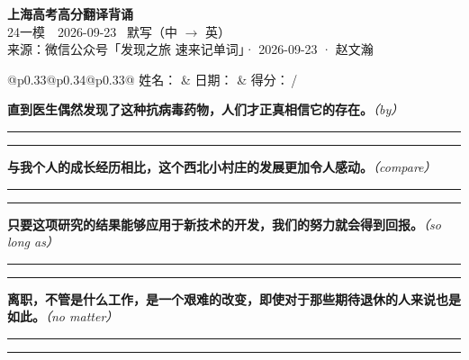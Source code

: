 \documentclass[11pt,a4paper]{article}
\newcommand{\num}[1]{\makebox[1.9em][r]{#1.}\hspace{0.3em}}
\newcommand{\wline}{\noindent\rule{\linewidth}{0.4pt}}
\newcommand{\prompt}[1]{\emph{\textcolor{tipblue}{\small（#1）}}}
\begin{document}
\pagestyle{plain}
\begin{center}
{\LARGE\bfseries 上海高考高分翻译背诵 }\\[0.25em]
{\large 24一模　2026-09-23 \quad\ 默写（中 $\to$ 英）}\\[0.35em]
{\footnotesize 来源：微信公众号「发现之旅 速来记单词」· 2026-09-23 · 赵文瀚}
\end{center}

\vspace{0.4em}
\noindent\begin{tabular}{@{}p{0.33\textwidth}@{}p{0.34\textwidth}@{}p{0.33\textwidth}@{}}
姓名：\underline{\hspace{2.0cm}} & 日期：\underline{\hspace{2.0cm}} & 得分：\underline{\hspace{1.4cm}}\,/ \\
\end{tabular}

\vspace{0.5em}

\vspace{0.8em}
\num{1}\textbf{直到医生偶然发现了这种抗病毒药物，人们才正真相信它的存在。}\prompt{by}

\vspace{0.3em}

\wline\vspace{0.3em}
\wline

\num{2}\textbf{与我个人的成长经历相比，这个西北小村庄的发展更加令人感动。}\prompt{compare}

\vspace{0.3em}

\wline\vspace{0.3em}
\wline

\num{3}\textbf{只要这项研究的结果能够应用于新技术的开发，我们的努力就会得到回报。}\prompt{so long as}

\vspace{0.3em}

\wline\vspace{0.3em}
\wline

\num{4}\textbf{离职，不管是什么工作，是一个艰难的改变，即使对于那些期待退休的人来说也是如此。}\prompt{no matter}

\vspace{0.3em}

\wline\vspace{0.3em}
\wline
\end{document}
